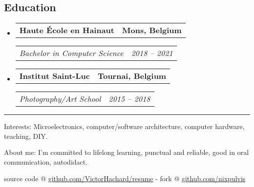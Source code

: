 \documentclass[10pt,letterpaper]{article}
\makeatletter
\newenvironment{indentsection}[1]
{\begin{list}{}
  {\setlength{\leftmargin}{#1}} \item[]
}
{\end{list}}
\newcommand{\headerrow}[2]
{\begin{tabular*}{\linewidth}{l@{\extracolsep{\fill}}r}
  #1 &
  #2 \\
\end{tabular*}}
\makeatother
\begin{document}
\subsection*{Education}
\begin{itemize}
  \parskip=0.1em

  \item
  \headerrow
    {\textbf{Haute École en Hainaut}}
    {\textbf{Mons, Belgium}}
  \headerrow
    {\emph{Bachelor in Computer Science}}
    {\emph{2018 -- 2021}}
  \item
  \headerrow
    {\textbf{Institut Saint-Luc}}
    {\textbf{Tournai, Belgium}}
  \headerrow
    {\emph{Photography/Art School}}
    {\emph{2015 -- 2018}}
\end{itemize}

\hrule
\begin{indentsection}{\parindent}
\begin{description*}
\item[Interests:]
  Microelectronics, computer/software architecture, computer hardware, teaching,
  DIY.
\item[About me:]
  I’m committed to lifelong learning, punctual and reliable,
  good in oral communication, autodidact.
\end{description*}
\end{indentsection}


\begin{center}
\footnotesize source code @
\href{http://www.github.com/VictorHachard/resume}
{github.com/VictorHachard/resume} - fork @
\href{http://www.github.com/nixpulvis}
{github.com/nixpulvis}
\end{center}
\end{document}
